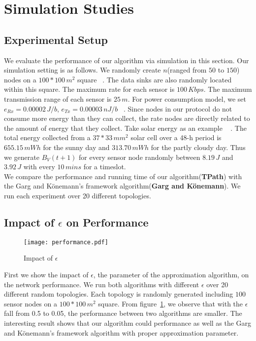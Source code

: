 \documentclass{article}
\begin{document}
\section{Simulation Studies}
\subsection{Experimental Setup}
We evaluate the performance of our algorithm via simulation in this section.
Our simulation setting is as follows. We randomly create $n$(ranged from $50$ to $150$) nodes
on a $100*100\,m^2$ square ~\cite{Maxi}. The data sinks are also randomly located within this square. The maximum rate for each sensor is $100\,Kbps$. The maximum transmission range of each sensor is $25\,m$. For power consumption model, we set $e_{Rx} = 0.00002\,J/b$, $e_{Tx} = 0.00003\,nJ/b$ ~\cite{Wire}. Since nodes in our protocol do not 
consume more energy than they can collect, the rate nodes are directly related to the amount of energy that they collect. Take solar energy as an example ~\cite{Ste} . The total energy collected from a $37 * 33\,mm^2$ solar cell over a 48-h period is $655.15\,mWh$ for the sunny day and $313.70\,mWh$ for the partly cloudy day. Thus we generate $B_V(t+1)$ for every sensor node randomly between $8.19\,J$ and $3.92\,J$ with every $10\,mins$ for a timeslot.\\
We compare the performance and running time of our algorithm(\textbf{TPath}) with the Garg and K\"{o}nemann's framework algorithm(\textbf{Garg and K\"{o}nemann}). We run each experiment over 20 different topologies.

\subsection{Impact of $\epsilon$ on Performance}

\begin{figure}[H]
\centering
\texttt{[image: performance.pdf]} 
\caption{Impact of $\epsilon$}
\label{f1}
\end{figure}

First we show the impact of $\epsilon$, the parameter of the approximation algorithm, on the network performance. We run both algorithms with different $\epsilon$ over 20 different random topologies. Each topology is randomly generated including $100$ sensor nodes on a $100*100\,m^2$ square. From figure~\ref{f1}, we observe that with the $\epsilon$ fall from 0.5 to 0.05, the performance between two algorithms are smaller. The interesting result shows that our algorithm could performance as well as the Garg and K\"{o}nemann's framework algorithm with proper approximation parameter.
\end{document}
